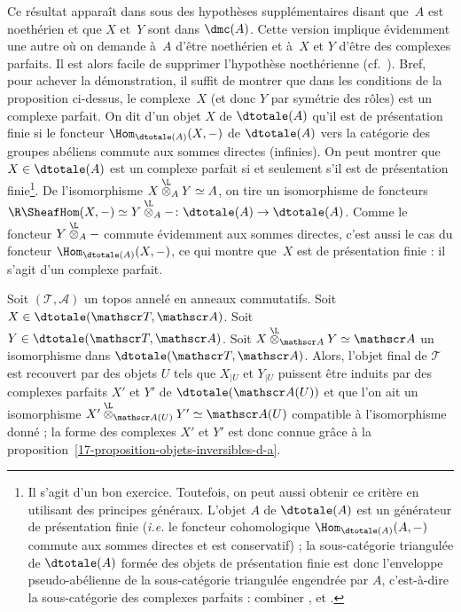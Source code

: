\documentclass[10pt]{../fichiers-configuration-latex/smfart}
\begin{document}
Ce résultat apparaît dans \cite[lemma~3.3, Chapter~V]{RD@Hartshorne}
sous des hypothèses supplémentaires disant que $A$ est noethérien et que
$X$ et $Y$ sont dans $\dmc(A)$. Cette version implique
évidemment une autre où on demande à $A$ d'être noethérien et à $X$ et $Y$
d'être des complexes parfaits. Il est alors facile de supprimer l'hypothèse
noethérienne (cf.~).
Bref, pour achever la démonstration, il suffit de montrer que
dans les conditions de la proposition ci-dessus, le complexe $X$ (et donc
$Y$ par symétrie des rôles) est un complexe parfait. On dit d'un objet $X$
de $\dtotale(A)$ qu'il est de présentation finie si le foncteur
$\Hom_{\dtotale(A)}(X,-)$ de $\dtotale(A)$ vers la catégorie des groupes
abéliens commute aux sommes directes (infinies). On peut montrer que
$X\in\dtotale(A)$ est un complexe parfait si et seulement s'il est de
présentation finie\;\footnote{Il s'agit d'un bon exercice. Toutefois, on
peut aussi obtenir ce critère en utilisant des principes généraux. L'objet
$A$ de $\dtotale(A)$ est un générateur de présentation finie (\emph{i.e.} le
foncteur cohomologique $\Hom_{\dtotale(A)}(A,-)$ commute aux sommes
directes et est conservatif) ; la sous-catégorie triangulée de $\dtotale(A)$
formée des objets de présentation finie est donc l'enveloppe
pseudo-abélienne de la sous-catégorie triangulée engendrée par $A$,
c'est-à-dire la sous-catégorie des complexes parfaits : combiner
\cite[proposition~8.4.1]{TC@Neeman}, \cite[lemma~4.4.5]{TC@Neeman} et
\cite[remark~4.2.6]{TC@Neeman}.}. De l'isomorphisme
$X\overset{\L}{\otimes}_A Y\simeq A$, on tire un isomorphisme de
foncteurs $\R\SheafHom(X,-)\simeq
Y\overset{\L}{\otimes}_A-\colon \dtotale(A)\to\dtotale(A)$. Comme le
foncteur $Y\overset{\L}{\otimes}_A-$ commute évidemment
aux sommes directes,
c'est aussi le cas du foncteur $\Hom_{\dtotale(A)}(X,-)$, ce qui
montre que $X$ est de présentation finie : il s'agit d'un complexe parfait.

\begin{proposition}\label{17-proposition-objets-inversibles-d-t-a}
Soit $(\mathscr T,\mathscr A)$ un topos annelé en anneaux commutatifs. Soit
$X\in\dtotale(\mathscr T,\mathscr A)$.
Soit $Y\in\dtotale(\mathscr T,\mathscr A)$. Soit
$X\overset{\L}{\otimes}_{\mathscr A}Y\simeq \mathscr A$ un
isomorphisme dans $\dtotale(\mathscr T,\mathscr A)$.
Alors, l'objet final de $\mathscr T$ est recouvert par des objets $U$
tels que $X_{|U}$ et $Y_{|U}$ puissent être 
induits par des complexes parfaits $X'$ et $Y'$ de $\dtotale(\mathscr A(U))$
et que l'on ait un isomorphisme $X'\overset{\L}{\otimes}_{\mathscr
A(U)}Y'\simeq \mathscr A(U)$ compatible à l'isomorphisme donné ; la
forme des complexes $X'$ et $Y'$ est donc connue grâce à la
proposition~\ref{17-proposition-objets-inversibles-d-a}.
\end{proposition}
\end{document}
